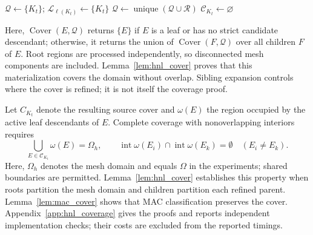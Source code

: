 \documentclass[a4paper,pdflatex,sn-mathphys-num]{sn-jnl}
\theoremstyle{thmstyleone}
\begin{document}
\begin{algorithm}[!htbp]
\SetAlgoLined
\caption{HNL Candidate Search and Source-Cover Construction}

\label{alg:hnl_expansion}
$\mathcal Q\leftarrow\{K_t\}$; $\mathcal L_{\ell(K_t)}\leftarrow\{K_t\}$\;
$\mathcal Q\leftarrow\operatorname{unique}(\mathcal Q\cup\mathcal R)$\;
$\mathcal C_{K_t}\leftarrow\varnothing$\;
\;
\end{algorithm}


Here, $\operatorname{Cover}(E,\mathcal Q)$ returns $\{E\}$ if $E$ is a leaf or has no strict candidate descendant; otherwise, it returns the union of $\operatorname{Cover}(F,\mathcal Q)$ over all children $F$ of $E$. Root regions are processed independently, so disconnected mesh components are included. Lemma~\ref{lem:hnl_cover} proves that this materialization covers the domain without overlap. Sibling expansion controls where the cover is refined; it is not itself the coverage proof.

Let \(C_{K_t}\) denote the resulting source cover and \(\omega(E)\) the region occupied by the active leaf descendants of \(E\). Complete coverage with nonoverlapping interiors requires
\begin{equation}
\bigcup_{E\in\mathcal C_{K_t}}\omega(E)=\Omega_h,
\qquad
\operatorname{int}\omega(E_i)\cap\operatorname{int}\omega(E_k)=\emptyset
\quad(E_i\ne E_k).
\label{eq:hnl_cover_property}
\end{equation}
Here, \(\Omega_h\) denotes the mesh domain and equals \(\Omega\) in the experiments; shared boundaries are permitted. Lemma~\ref{lem:hnl_cover} establishes this property when roots partition the mesh domain and children partition each refined parent. Lemma~\ref{lem:mac_cover} shows that MAC classification preserves the cover. Appendix~\ref{app:hnl_coverage} gives the proofs and reports independent implementation checks; their costs are excluded from the reported timings.
\end{document}
